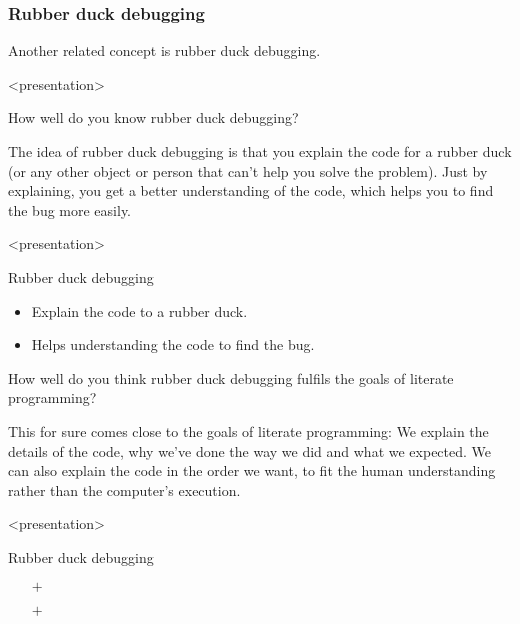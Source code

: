 \subsubsection{Rubber duck debugging}

Another related concept is rubber duck debugging.

\begin{frame}<presentation>
\begin{activity}
How well do you know rubber duck debugging?
\end{activity}
\end{frame}

The idea of rubber duck debugging is that you explain the code for a rubber 
duck (or any other object or person that can't help you solve the problem).
Just by explaining, you get a better understanding of the code, which helps you 
to find the bug more easily.

\begin{frame}<presentation>
\begin{block}{Rubber duck debugging}
  \begin{itemize}
    \item Explain the code to a rubber duck.
    \item Helps understanding the code to find the bug.
  \end{itemize}
\end{block}
\end{frame}

\begin{frame}
\begin{activity}
How well do you think rubber duck debugging fulfils the goals of literate 
programming?
\end{activity}
\end{frame}

This for sure comes close to the goals of literate programming:
We explain the details of the code, why we've done the way we did and what we 
expected.
We can also explain the code in the order we want, to fit the human 
understanding rather than the computer's execution.

\begin{frame}<presentation>
\begin{block}{Rubber duck debugging}
  \begin{itemize}
    \item[\(+\)] {\color{green!75!black}\LPexplain}
    \item[\(+\)] {\color{green!75!black}\LPorder}
  \end{itemize}
\end{block}
\end{frame}

